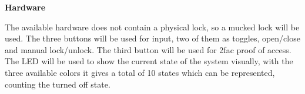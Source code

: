 \textbf{Hardware}

The available hardware does not contain a physical lock, so a mucked lock will be used.
The three buttons will be used for input, two of them as toggles, open/close and manual lock/unlock.
The third button will be used for 2fac proof of access.
The LED will be used to show the current state of the system visually, with the three available colors it gives a total of 10 states which can be represented, counting the turned off state.
